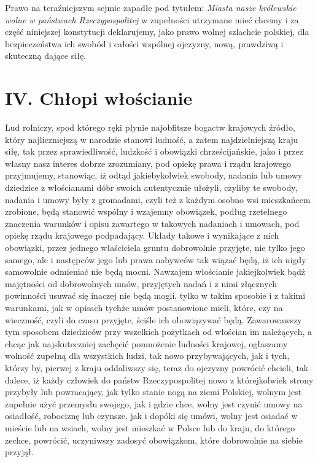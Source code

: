 \documentclass{book}
\begin{document}
 Prawo na teraźniejszym sejmie zapadłe pod tytułem: \textit{Miasta nasze królewskie wolne w państwach Rzeczypospolitej} w zupełności utrzymane mieć chcemy i za część niniejszej konstytucji deklarujemy, jako prawo wolnej szlachcie polskiej, dla bezpieczeństwa ich swobód i całości wspólnej ojczyzny, nową,  prawdziwą i skuteczną dające siłę. 

 
\section*{IV. Chłopi włościanie}

Lud rolniczy, spod którego ręki płynie najobfitsze bogactw krajowych źródło, który najliczniejszą w narodzie stanowi ludność,
a zatem najdzielniejszą kraju siłę, tak przez sprawiedliwość, ludzkość i obowiązki chrześcijańskie, jako i przez własny nasz interes dobrze zrozumiany, pod opiekę prawa
i rządu krajowego przyjmujemy, stanowiąc, iż odtąd jakiebykolwiek swobody, nadania lub umowy dziedzice z włościanami dóbr swoich autentycznie ułożyli,
czyliby te swobody, nadania i umowy były z gromadami, czyli też z każdym osobno wsi mieszkańcem zrobione, będą stanowić wspólny i wzajemny obowiązek, podług
rzetelnego znaczenia warunków i opisu zawartego w takowych nadaniach i umowach, pod opiekę rządu krajowego podpadający.
Układy takowe i wynikające z nich obowiązki, przez jednego właściciela gruntu dobrowolnie przyjęte, nie tylko jego samego, ale i następców jego lub prawa nabywców tak wiązać będą,
iż ich nigdy samowolnie odmieniać nie będą mocni.
Nawzajem włościanie jakiejkolwiek bądź majętności od dobrowolnych umów, przyjętych nadań i z nimi złącznych powinności usuwać się inaczej nie będą mogli,
tylko w takim sposobie i z takimi warunkami, jak w opisach tychże umów postanowione mieli, które, czy na wieczność, czyli do czasu przyjęte, ściśle ich obowiązywać będą.
Zawarowawszy tym sposobem dziedziców przy wszelkich pożytkach od włościan im należących, a chcąc jak najskuteczniej zachęcić pomnożenie ludności krajowej,
ogłaszamy wolność zupełną dla wszystkich ludzi, tak nowo przybywających, jak i tych, którzy by, pierwej z kraju oddaliwszy się, teraz do ojczyzny powrócić chcieli,
tak dalece, iż każdy człowiek do państw Rzeczypospolitej nowo z którejkolwiek strony przybyły lub powracający, jak tylko stanie nogą na ziemi Polskiej,
wolnym jest zupełnie użyć przemysłu swojego, jak i gdzie chce, wolny jest czynić umowy na osiadłość, robociznę lub czynsze, jak i dopóki się umówi,
wolny jest osiadać w mieście lub na wsiach, wolny jest mieszkać w Polsce lub do kraju, do którego zechce, powrócić, uczyniwszy zadosyć obowiązkom, które dobrowolnie na siebie przyjął.
 
\end{document}
